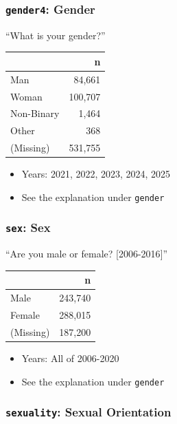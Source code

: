 \documentclass[10pt,article,oneside]{memoir}
\begin{document}
\subsubsection{\texorpdfstring{\texttt{gender4}:
Gender}{gender4: Gender}}\label{gender4-gender}

``What is your gender?''

\begin{table}[H]
\centering
\begin{tabular}[t]{lr}
\toprule
 & n\\
\midrule
Man & 84,661\\
Woman & 100,707\\
Non-Binary & 1,464\\
Other & 368\\
(Missing) & 531,755\\
\bottomrule
\end{tabular}
\end{table}

\begin{itemize}
\tightlist
\item
  Years: 2021, 2022, 2023, 2024, 2025
\item
  See the explanation under \texttt{gender}
\end{itemize}

\subsubsection{\texorpdfstring{\texttt{sex}:
Sex}{sex: Sex}}\label{sex-sex}

``Are you male or female? {[}2006-2016{]}''

\begin{table}[H]
\centering
\begin{tabular}[t]{lr}
\toprule
 & n\\
\midrule
Male & 243,740\\
Female & 288,015\\
(Missing) & 187,200\\
\bottomrule
\end{tabular}
\end{table}

\begin{itemize}
\tightlist
\item
  Years: All of 2006-2020
\item
  See the explanation under \texttt{gender}
\end{itemize}

\subsubsection{\texorpdfstring{\texttt{sexuality}: Sexual
Orientation}{sexuality: Sexual Orientation}}\label{sexuality-sexual-orientation}
\end{document}
